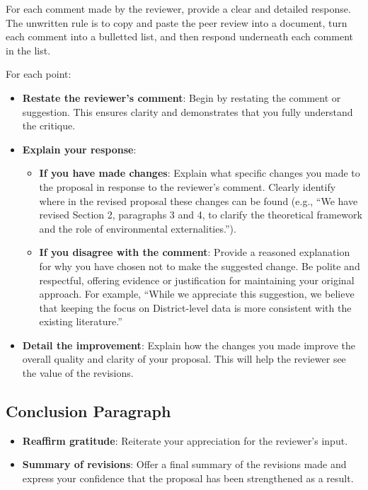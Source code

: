 \documentclass[
]{article}
\providecommand{\tightlist}{%
  \setlength{\itemsep}{0pt}\setlength{\parskip}{0pt}}
\begin{document}
For each comment made by the reviewer, provide a clear and detailed response. The unwritten rule is to copy and paste the peer review into a document, turn each comment into a bulletted list, and then respond underneath each comment in the list.

For each point:

\begin{itemize}
\item
  \textbf{Restate the reviewer's comment}: Begin by restating the comment or suggestion. This ensures clarity and demonstrates that you fully understand the critique.
\item
  \textbf{Explain your response}:

  \begin{itemize}
  \tightlist
  \item
    \textbf{If you have made changes}: Explain what specific changes you made to the proposal in response to the reviewer's comment. Clearly identify where in the revised proposal these changes can be found (e.g., ``We have revised Section 2, paragraphs 3 and 4, to clarify the theoretical framework and the role of environmental externalities.'').
  \item
    \textbf{If you disagree with the comment}: Provide a reasoned explanation for why you have chosen not to make the suggested change. Be polite and respectful, offering evidence or justification for maintaining your original approach. For example, ``While we appreciate this suggestion, we believe that keeping the focus on District-level data is more consistent with the existing literature.''
  \end{itemize}
\item
  \textbf{Detail the improvement}: Explain how the changes you made improve the overall quality and clarity of your proposal. This will help the reviewer see the value of the revisions.
\end{itemize}

\hypertarget{conclusion-paragraph}{%
\subsection{Conclusion Paragraph}\label{conclusion-paragraph}}

\begin{itemize}
\tightlist
\item
  \textbf{Reaffirm gratitude}: Reiterate your appreciation for the reviewer's input.
\item
  \textbf{Summary of revisions}: Offer a final summary of the revisions made and express your confidence that the proposal has been strengthened as a result.
\end{itemize}
\end{document}
